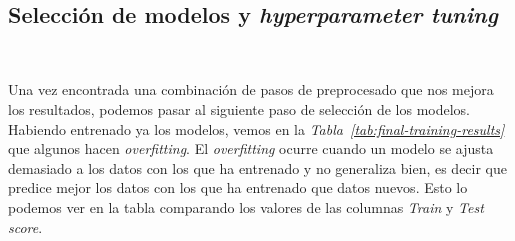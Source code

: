 \begin{table}[!h]
    \centering
    \caption{Comparación de los resultados de entrenar derivando, estandarizando y ajustando la dimensionalidad de los datos; frente a solo derivando y estandarizando. Fuente propia.}\ \label{tab:derivative-standarization-dimensionality-results}
\end{table}


\subsection{Selección de modelos y \textit{hyperparameter tuning}}\ \label{sec:entrenamiento}

Una vez encontrada una combinación de pasos de preprocesado que nos mejora los resultados, podemos pasar al siguiente paso de selección de los modelos. Habiendo entrenado ya los modelos, vemos en la \textit{Tabla\ \ref{tab:final-training-results}} que algunos hacen \textit{overfitting}. El \textit{overfitting} ocurre cuando un modelo se ajusta demasiado a los datos con los que ha entrenado y no generaliza bien, es decir que predice mejor los datos con los que ha entrenado que datos nuevos. Esto lo podemos ver en la tabla comparando los valores de las columnas \textit{Train} y \textit{Test score}.

